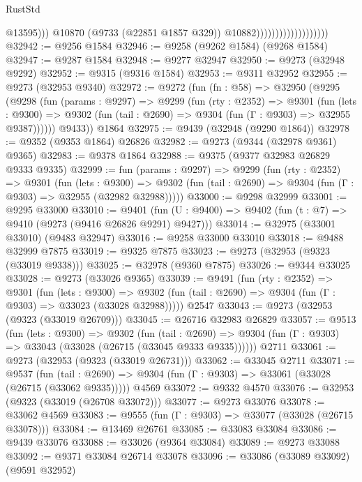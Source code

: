 \begin{lexlean}{RustStd}
\begin{coremodule}
{\begin{coremodule}
{{{{{{{{{{{{{{{{{{{{{{{{{{{{{{{{{{{{{{{{{{{{{{{{{{{{{{{                                                @13595)))
                                          @10870
                                          (@9733 (@22851 @1857 @329))
                                          @10882)))))))))))))))))))
@32942 := @9256 @1584
@32946 := @9258 (@9262 @1584) (@9268 @1584)
@32947 := @9287 @1584
@32948 := @9277 @32947
@32950 := @9273 (@32948 @9292)
@32952 := @9315 (@9316 @1584)
@32953 := @9311 @32952
@32955 := @9273 (@32953 @9340)
@32972 := @9272
    (fun (fn : @58) =>
    @32950
      (@9295
        (@9298
          (fun (params : @9297) =>
          @9299
            (fun (rty : @2352) =>
            @9301
              (fun (lets : @9300) =>
              @9302 (fun (tail : @2690) => @9304 (fun (Γ : @9303) => @32955 @9387))))))
        @9433))
    @1864
@32975 := @9439 (@32948 (@9290 @1864))
@32978 := @9352 (@9353 @1864) @26826
@32982 := @9273 (@9344 (@32978 @9361) @9365)
@32983 := @9378 @1864
@32988 := @9375 (@9377 @32983 @26829 @9333 @9335)
@32999 := fun (params : @9297) =>
  @9299
    (fun (rty : @2352) =>
    @9301
      (fun (lets : @9300) =>
      @9302 (fun (tail : @2690) => @9304 (fun (Γ : @9303) => @32955 (@32982 @32988)))))
@33000 := @9298 @32999
@33001 := @9295 @33000
@33010 := @9401
    (fun (U : @9400) => @9402 (fun (t : @7) => @9410 (@9273 (@9416 @26826 @9291) @9427)))
@33014 := @32975 (@33001 @33010) (@9483 @32947)
@33016 := @9258 @33000 @33010
@33018 := @9488 @32999 @7875
@33019 := @9325 @7875
@33023 := @9273 (@32953 (@9323 (@33019 @9338)))
@33025 := @32978 (@9360 @7875)
@33026 := @9344 @33025
@33028 := @9273 (@33026 @9365)
@33039 := @9491
    (fun (rty : @2352) =>
    @9301
      (fun (lets : @9300) =>
      @9302 (fun (tail : @2690) => @9304 (fun (Γ : @9303) => @33023 (@33028 @32988)))))
    @2547
@33043 := @9273 (@32953 (@9323 (@33019 @26709)))
@33045 := @26716 @32983 @26829
@33057 := @9513
    (fun (lets : @9300) =>
    @9302
      (fun (tail : @2690) =>
      @9304 (fun (Γ : @9303) => @33043 (@33028 (@26715 (@33045 @9333 @9335))))))
    @2711
@33061 := @9273 (@32953 (@9323 (@33019 @26731)))
@33062 := @33045 @2711
@33071 := @9537
    (fun (tail : @2690) => @9304 (fun (Γ : @9303) => @33061 (@33028 (@26715 (@33062 @9335)))))
    @4569
@33072 := @9332 @4570
@33076 := @32953 (@9323 (@33019 (@26708 @33072)))
@33077 := @9273 @33076
@33078 := @33062 @4569
@33083 := @9555 (fun (Γ : @9303) => @33077 (@33028 (@26715 @33078)))
@33084 := @13469 @26761
@33085 := @33083 @33084
@33086 := @9439 @33076
@33088 := @33026 (@9364 @33084)
@33089 := @9273 @33088
@33092 := @9371 @33084 @26714 @33078
@33096 := @33086 (@33089 @33092) (@9591 @32952)
}}}}}}}}}}}}}}}}}}}}}}}}}}}}}}}}}}}}}}}}}}}}}}}}}}}}}}}
\end{coremodule}}
\end{coremodule}
\end{lexlean}
